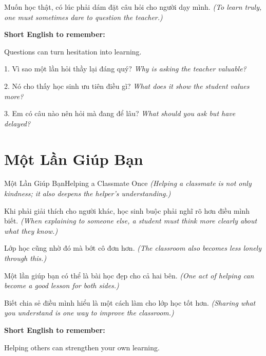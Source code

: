 \begin{baihoc}
Muốn học thật, có lúc phải dám đặt câu hỏi cho người dạy mình.
\textit{(To learn truly, one must sometimes dare to question the teacher.)}
\end{baihoc}

\begin{ghinhoanh}
\textbf{Short English to remember:}

Questions can turn hesitation into learning.

\end{ghinhoanh}

\begin{tuhocnhanh}
1. Vì sao một lần hỏi thầy lại đáng quý? \textit{Why is asking the teacher valuable?}

2. Nó cho thấy học sinh ưu tiên điều gì? \textit{What does it show the student values more?}

3. Em có câu nào nên hỏi mà đang để lâu? \textit{What should you ask but have delayed?}
\end{tuhocnhanh}
\ngancach

\section{Một Lần Giúp Bạn}
\begin{truyen}{Một Lần Giúp Bạn}{Helping a Classmate Once}
\textit{(Helping a classmate is not only kindness; it also deepens the helper's understanding.)}

Khi phải giải thích cho người khác, học sinh buộc phải nghĩ rõ hơn điều mình biết.
\textit{(When explaining to someone else, a student must think more clearly about what they know.)}

Lớp học cũng nhờ đó mà bớt cô đơn hơn.
\textit{(The classroom also becomes less lonely through this.)}

Một lần giúp bạn có thể là bài học đẹp cho cả hai bên.
\textit{(One act of helping can become a good lesson for both sides.)}
\end{truyen}

\begin{baihoc}
Biết chia sẻ điều mình hiểu là một cách làm cho lớp học tốt hơn.
\textit{(Sharing what you understand is one way to improve the classroom.)}
\end{baihoc}

\begin{ghinhoanh}
\textbf{Short English to remember:}

Helping others can strengthen your own learning.

\end{ghinhoanh}

